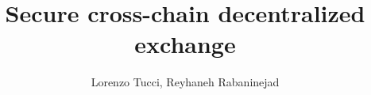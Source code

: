 \documentclass{article}      	%
\begin{document}
         
\author{Lorenzo Tucci, Reyhaneh Rabaninejad}
\title{Secure cross-chain decentralized exchange}

\maketitle

\tableofcontents
\newpage

\begin{todobox}

\end{todobox}






\end{document}
